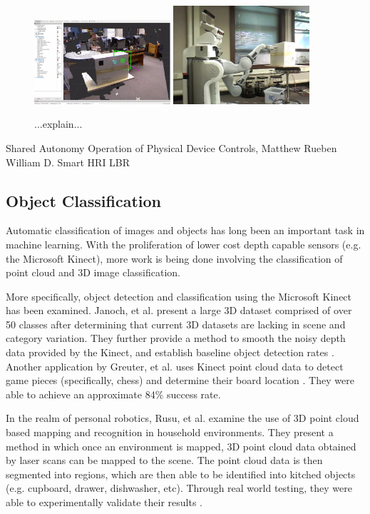 \documentclass{article}
\begin{document}
\begin{figure}[h!]
    \centering
    \includegraphics[width=0.45\textwidth]{Shared_Autonomy_1.png}
    \includegraphics[width=0.45\textwidth]{Shared_Autonomy_2.png}
    \caption{...explain...}
    \label{fig:sharedAutonomy}
\end{figure}
Shared Autonomy Operation of Physical Device Controls, Matthew Rueben William D. Smart HRI LBR

\subsection{Object Classification}
Automatic classification of images and objects has long been an important task in machine learning. With the proliferation of lower cost depth capable sensors (e.g. the Microsoft Kinect), more work is being done involving the classification of point cloud and 3D image classification.

More specifically, object detection and classification using the Microsoft Kinect has been examined. Janoch, et al. present a large 3D dataset comprised of over 50 classes after determining that current 3D datasets are lacking in scene and category variation. They further provide a method to smooth the noisy depth data provided by the Kinect, and establish baseline object detection rates \cite{kinectWork}. Another application by Greuter, et al. uses Kinect point cloud data to detect game pieces (specifically, chess) and determine their board location \cite{eurobot}. They were able to achieve an approximate 84\% success rate.

In the realm of personal robotics, Rusu, et al. examine the use of 3D point cloud based mapping and recognition in household environments. They present a method in which once an environment is mapped, 3D point cloud data obtained by laser scans can be mapped to the scene. The point cloud data is then segmented into regions, which are then able to be identified into kitched objects (e.g. cupboard, drawer, dishwasher, etc). Through real world testing, they were able to experimentally validate their results \cite{mapKitchen, mapHouse}. 
\end{document}

